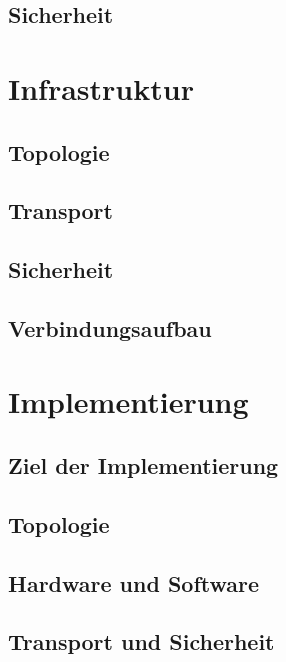 \documentclass[doktyp=barbeit]{TUBAFarbeiten}
\begin{document}
	\subsection{Sicherheit}

\newpage
\section{Infrastruktur}
	\label{sec: infra allg}
	

	\subsection{Topologie}
		\label{sec: infra topologie}
		

	\subsection{Transport}
		\label{sec: infra transport}
		

	\subsection{Sicherheit}
		\label{sec: infra sicherheit}

	\subsection{Verbindungsaufbau}

\newpage
\section{Implementierung}

	\subsection{Ziel der Implementierung}

	\subsection{Topologie}

	\subsection{Hardware und Software}

	\subsection{Transport und Sicherheit}
\end{document}
